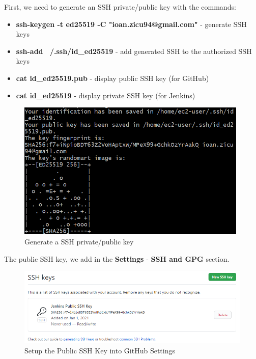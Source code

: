 \documentclass[12pt,a4paper,twoside]{article}
\begin{document}
First, we need to generate an SSH private/public key with the commands:

\begin{itemize}

	\item \textbf{ssh-keygen -t ed25519 -C "ioan.zicu94@gmail.com"} - generate SSH keys

	\item \textbf{ssh-add ~/.ssh/id\_ed25519} - add generated SSH to the authorized SSH keys

	\item \textbf{cat id\_ed25519.pub} - display public SSH key (for GitHub)

	\item \textbf{cat id\_ed25519} - display private SSH key (for Jenkins)

\end{itemize}


\begin{figure}[H]
    \centering
        \includegraphics[width=11cm]{images-git-heroku/generate-ssh-keys.png}
        \caption{Generate a SSH private/public key}
\end{figure}



The public SSH key, we add in the \textbf{Settings} - \textbf{SSH and GPG} section.


\begin{figure}[H]
    \centering
        \includegraphics[width=14cm]{images-git-heroku/add-public-key-github.png}
        \caption{Setup the Public SSH Key into GitHub Settings}
\end{figure}
\end{document}
